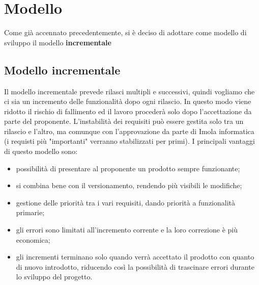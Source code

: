 \chapter{Modello}
Come già accennato precedentemente, si è deciso di adottare come modello di sviluppo il modello \textbf{incrementale}
\section{Modello incrementale}
Il modello incrementale prevede rilasci multipli e successivi, quindi vogliamo che ci sia un incremento delle funzionalità dopo ogni rilascio. In questo modo viene ridotto il rischio di fallimento ed il lavoro procederà solo dopo l’accettazione da parte del proponente. L’instabilità dei requisiti può essere gestita solo tra un rilascio e l’altro, ma comunque con l’approvazione da parte di Imola informatica (i requisti più "importanti" verranno stabilizzati per primi). I principali vantaggi di questo modello sono:
\begin{itemize}
    \item possibilità di presentare al proponente un prodotto sempre funzionante;
    \item si combina bene con il versionamento, rendendo più visibili le modifiche;
    \item gestione delle priorità tra i vari requisiti, dando priorità a funzionalità primarie;
    \item gli errori sono limitati all’incremento corrente e la loro correzione è più economica;
    \item gli incrementi terminano solo quando verrà accettato il prodotto con quanto di nuovo introdotto, riducendo così la possibilità di trascinare errori durante lo sviluppo del progetto.
\end{itemize}